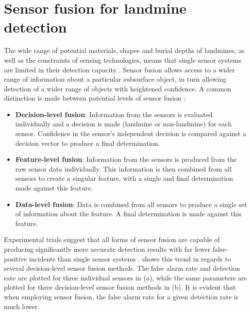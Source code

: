 \documentclass[main.tex]{subfiles}
\begin{document}
\section{Sensor fusion for landmine detection}
The wide range of potential materials, shapes and burial depths of landmines, as well as the constraints of sensing technologies, means that single sensor systems are limited in their detection capacity \parencite{Yarovoy2009}. Sensor fusion allows access to a wider range of information about a particular subsurface object, in turn allowing detection of a wider range of objects with heightened confidence. 
A common distinction is made between potential levels of sensor fusion \parencite{schavemaker2001depth}:
\begin{itemize}
\item \textbf{Decision-level fusion}: Information from the sensors is evaluated individually and a decision is made (landmine or non-landmine) for each sensor. Confidence in the sensor's independent decision is compared against a decision vector to produce a final determination.
\item \textbf{Feature-level fusion}: Information from the sensors is produced from the raw sensor data individually. This information is then combined from all sensors to create a singular feature, with a single and final determination made against this feature. 
\item \textbf{Data-level fusion}: Data is combined from all sensors to produce a single set of information about the feature. A final determination is made against this feature.
\end{itemize}
Experimental trials suggest that all forms of sensor fusion are capable of producing significantly more accurate detection results with far fewer false-positive incidents than single sensor systems \parencite{Yarovoy2009}.  shows this trend in regards to several decision-level sensor fusion methods. The false alarm rate and detection rate are plotted for three individual sensors in  (a), while the same parameters are plotted for three decision-level sensor fusion methods in  (b). It is evident that when employing sensor fusion, the false alarm rate for a given detection rate is much lower.    
\end{document}
